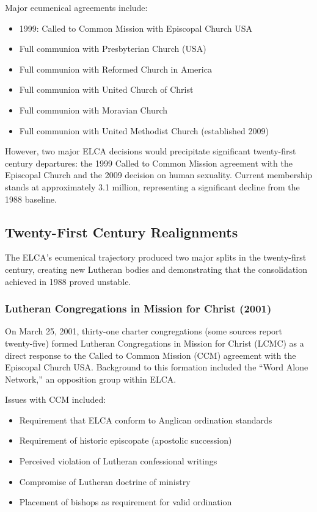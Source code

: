 Major ecumenical agreements include:

\begin{itemize}
\item 1999: Called to Common Mission with Episcopal Church USA
\item Full communion with Presbyterian Church (USA)
\item Full communion with Reformed Church in America
\item Full communion with United Church of Christ
\item Full communion with Moravian Church
\item Full communion with United Methodist Church (established 2009)
\end{itemize}

However, two major ELCA decisions would precipitate significant twenty-first century departures: the 1999 Called to Common Mission agreement with the Episcopal Church and the 2009 decision on human sexuality. Current membership stands at approximately 3.1 million, representing a significant decline from the 1988 baseline.

\subsection{Twenty-First Century Realignments}

The ELCA's ecumenical trajectory produced two major splits in the twenty-first century, creating new Lutheran bodies and demonstrating that the consolidation achieved in 1988 proved unstable.

\subsubsection{Lutheran Congregations in Mission for Christ (2001)}

On March 25, 2001, thirty-one charter congregations (some sources report twenty-five) formed Lutheran Congregations in Mission for Christ (LCMC) as a direct response to the Called to Common Mission (CCM) agreement with the Episcopal Church USA. Background to this formation included the ``Word Alone Network,'' an opposition group within ELCA.

Issues with CCM included:

\begin{itemize}
\item Requirement that ELCA conform to Anglican ordination standards
\item Requirement of historic episcopate (apostolic succession)
\item Perceived violation of Lutheran confessional writings
\item Compromise of Lutheran doctrine of ministry
\item Placement of bishops as requirement for valid ordination
\end{itemize}

